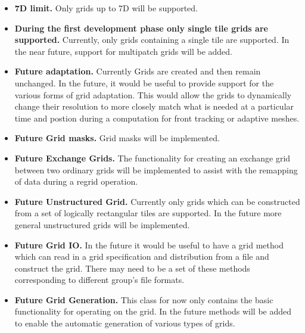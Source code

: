 

\begin{itemize}

\item {\bf 7D limit.}  Only grids up to 7D will be supported.

\item {\bf During the first development phase only single
tile grids are supported.}  Currently, only grids containing
a single tile are supported.  In the near future, support
for multipatch grids will be added. 

\item {\bf Future adaptation.}  Currently Grids
are created and then remain unchanged. In the future, it would
be useful to provide support for the various forms of grid
adaptation. This would allow the grids to dynamically change
their resolution to more closely match what is needed at a particular
time and postion during a computation for front tracking or adaptive meshes.

\item {\bf Future Grid masks.}  Grid masks will be implemented.

\item {\bf Future Exchange Grids.}  The functionality for creating an 
exchange grid between two ordinary grids will be implemented
to assist with the remapping of data during a regrid operation. 

\item {\bf Future Unstructured Grid.}  Currently only grids which can be constructed from a set of logically rectangular tiles are supported. In the future more general unstructured grids will be implemented.

\item {\bf Future Grid IO.} In the future it would be useful to have a grid method which can read in a grid specification and distribution from a file and construct the grid. There may need to be a set of these methods corresponding to different group's file formats.

\item {\bf Future Grid Generation.} This class for now only contains
the basic functionality for operating on the grid. In the future
methods will be added to enable the automatic generation of various types of
grids. 


\end{itemize}

